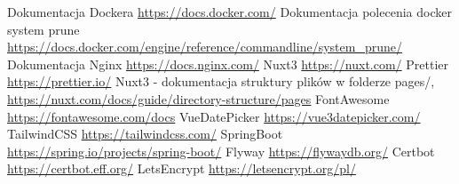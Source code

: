 \documentclass[shortabstract]{iithesis}
\begin{document}
\label{subsec:Certbot}


\begin{thebibliography}{1}
     Dokumentacja Dockera \url{https://docs.docker.com/}
     Dokumentacja polecenia docker system prune \url{https://docs.docker.com/engine/reference/commandline/system_prune/}
     Dokumentacja Nginx \url{https://docs.nginx.com/}
     Nuxt3 \url{https://nuxt.com/}
     Prettier \url{https://prettier.io/}
     Nuxt3 - dokumentacja struktury plików w folderze pages/, \url{https://nuxt.com/docs/guide/directory-structure/pages}
     FontAwesome \url{https://fontawesome.com/docs}
     VueDatePicker \url{https://vue3datepicker.com/}
     TailwindCSS \url{https://tailwindcss.com/}
     SpringBoot \url{https://spring.io/projects/spring-boot/}
     Flyway \url{https://flywaydb.org/}
     Certbot \url{https://certbot.eff.org/}
     LetsEncrypt \url{https://letsencrypt.org/pl/}
\end{thebibliography}
\end{document}

